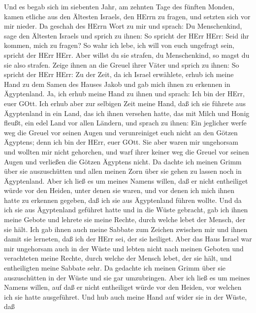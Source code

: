  Und es begab sich im siebenten Jahr, am zehnten Tage des
fünften Monden, kamen etliche aus den Ältesten Israels, den HErrn zu
fragen, und setzten sich vor mir nieder.  Da geschah des
HErrn Wort zu mir und sprach:  Du Menschenkind, sage den
Ältesten Israels und sprich zu ihnen: So spricht der HErr HErr: Seid ihr
kommen, mich zu fragen? So wahr ich lebe, ich will von euch ungefragt
sein, spricht der HErr HErr.  Aber willst du sie strafen, du
Menschenkind, so magst du sie also strafen. Zeige ihnen an die Greuel
ihrer Väter  und sprich zu ihnen: So spricht der HErr HErr:
Zu der Zeit, da ich Israel erwählete, erhub ich meine Hand zu dem Samen
des Hauses Jakob und gab mich ihnen zu erkennen in Ägyptenland. Ja, ich
erhub meine Hand zu ihnen und sprach: Ich bin der HErr, euer GOtt.
 Ich erhub aber zur selbigen Zeit meine Hand, daß ich sie
führete aus Ägyptenland in ein Land, das ich ihnen versehen hatte, das
mit Milch und Honig fleußt, ein edel Land vor allen Ländern,
 und sprach zu ihnen: Ein jeglicher werfe weg die Greuel vor
seinen Augen und verunreiniget euch nicht an den Götzen Ägyptens; denn
ich bin der HErr, euer GOtt.  Sie aber waren mir ungehorsam
und wollten mir nicht gehorchen, und warf ihrer keiner weg die Greuel
vor seinen Augen und verließen die Götzen Ägyptens nicht. Da dachte ich
meinen Grimm über sie auszuschütten und allen meinen Zorn über sie gehen
zu lassen noch in Ägyptenland.  Aber ich ließ es um meines
Namens willen, daß er nicht entheiliget würde vor den Heiden, unter
denen sie waren, und vor denen ich mich ihnen hatte zu erkennen gegeben,
daß ich sie aus Ägyptenland führen wollte.  Und da ich sie
aus Ägyptenland geführet hatte und in die Wüste gebracht, 
gab ich ihnen meine Gebote und lehrete sie meine Rechte, durch welche
lebet der Mensch, der sie hält.  Ich gab ihnen auch meine
Sabbate zum Zeichen zwischen mir und ihnen damit sie lerneten, daß ich
der HErr sei, der sie heiliget.  Aber das Haus Israel war
mir ungehorsam auch in der Wüste und lebten nicht nach meinen Geboten
und verachteten meine Rechte, durch welche der Mensch lebet, der sie
hält, und entheiligten meine Sabbate sehr. Da gedachte ich meinen Grimm
über sie auszuschütten in der Wüste und sie gar umzubringen.
 Aber ich ließ es um meines Namens willen, auf daß er nicht
entheiliget würde vor den Heiden, vor welchen ich sie hatte ausgeführet.
 Und hub auch meine Hand auf wider sie in der Wüste, daß
